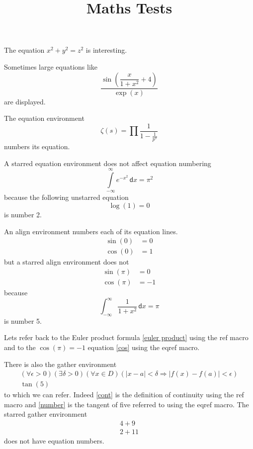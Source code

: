 \documentclass{amsart}
\title{Maths Tests}
\begin{document}
The equation $x^2 + y^2 = z^2$ is interesting.

Sometimes large equations like
\[
\dfrac{\sin\left( \dfrac{x}{1+x^2}  + 4\right)}{\exp(x)}
\]
are displayed.

The equation environment
\begin{equation}
\label{euler product}
\zeta(s) = \prod \dfrac{1}{1 - \tfrac{1}{p^s}}
\end{equation}
numbers its equation.

A starred equation environment does not affect equation numbering
\begin{equation*}
\int\limits_{-\infty}^\infty e^{-x^2} \,\mathsf{d} x = \pi^2
\end{equation*}
because the following unstarred equation
\begin{equation}
\log(1) = 0
\end{equation}
is number 2.

An align environment numbers each of its equation lines.
\begin{align}
\label{sin}
\sin(0) &= 0 \\
\label{cos}
\cos(0) &= 1
\end{align}
but a starred align environment does not
\begin{align*}
\sin(\pi) &= 0 \\
\cos(\pi) &= -1
\end{align*}
because
\begin{equation}
\int_{-\infty}^\infty \dfrac{1}{1+x^2} \,\mathsf{d} x = \pi
\end{equation}
is number 5.

Lets refer back to the Euler product formula \ref{euler product} using the ref macro and to the $\cos(\pi) = -1$ equation \eqref{cos} using the eqref macro.

There is also the gather environment
\begin{gather}
\label{cont}
(\forall \epsilon > 0) (\exists \delta > 0) (\forall x \in D) ( |x-a| < \delta \Rightarrow |f(x) - f(a)| < \epsilon) \\
\label{number}
\tan(5)
\end{gather}
to which we can refer.
Indeed \ref{cont} is the definition of continuity using the ref macro and \eqref{number} is the tangent of five referred to using the eqref macro.
The starred gather environment
\begin{gather*}
4+9 \\
2+11
\end{gather*}
does not have equation numbers.
\end{document}
